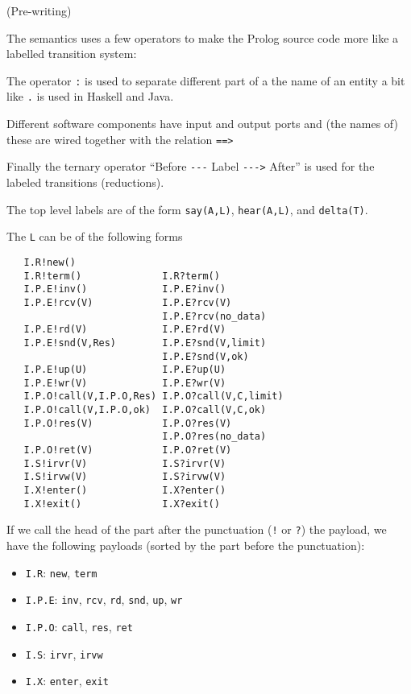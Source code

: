 (Pre-writing)

The semantics uses a few operators to make the Prolog source code more
like a labelled transition system:

The operator \verb+:+ is used to separate different part of a the name of
an entity a bit like \verb+.+ is used in Haskell and Java.

Different software components have input and output ports and (the
names of) these are wired together with the relation \verb+==>+

Finally the ternary operator ``Before \verb+---+ Label \verb+--->+
After'' is used for the labeled transitions (reductions).

The top level labels are of the form \verb+say(A,L)+,
\verb+hear(A,L)+, and \verb+delta(T)+.

The \verb+L+ can be of the following forms

\begin{verbatim}
   I.R!new()
   I.R!term()              I.R?term()
   I.P.E!inv()             I.P.E?inv()
   I.P.E!rcv(V)            I.P.E?rcv(V)
                           I.P.E?rcv(no_data)
   I.P.E!rd(V)             I.P.E?rd(V)
   I.P.E!snd(V,Res)        I.P.E?snd(V,limit)
                           I.P.E?snd(V,ok)
   I.P.E!up(U)             I.P.E?up(U)
   I.P.E!wr(V)             I.P.E?wr(V)
   I.P.O!call(V,I.P.O,Res) I.P.O?call(V,C,limit)
   I.P.O!call(V,I.P.O,ok)  I.P.O?call(V,C,ok)
   I.P.O!res(V)            I.P.O?res(V)
                           I.P.O?res(no_data)
   I.P.O!ret(V)            I.P.O?ret(V)
   I.S!irvr(V)             I.S?irvr(V)
   I.S!irvw(V)             I.S?irvw(V)
   I.X!enter()             I.X?enter()
   I.X!exit()              I.X?exit()
\end{verbatim}

If we call the head of the part after the punctuation (\verb+!+ or
\verb+?+) the payload, we have the following payloads (sorted by the
part before the punctuation):

\begin{itemize}
\item \verb+I.R+:   \verb+new+, \verb+term+
\item \verb+I.P.E+: \verb+inv+, \verb+rcv+, \verb+rd+, \verb+snd+, \verb+up+, \verb+wr+
\item \verb+I.P.O+: \verb+call+, \verb+res+, \verb+ret+
\item \verb+I.S+:   \verb+irvr+, \verb+irvw+
\item \verb+I.X+:   \verb+enter+, \verb+exit+
\end{itemize}

